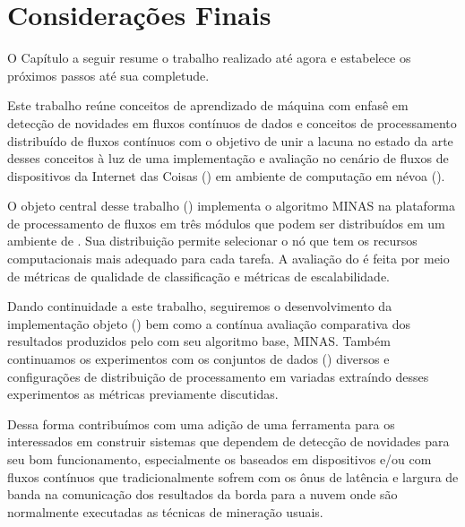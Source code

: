 \chapter{Considerações Finais}\label{cha:final}

\begin{resumocap}
  O Capítulo a seguir resume o trabalho realizado até agora e estabelece
  os próximos passos até sua completude.
\end{resumocap}

Este trabalho reúne conceitos de aprendizado de máquina com enfasê em detecção
de novidades em fluxos contínuos de dados e conceitos de processamento
distribuído de fluxos contínuos com o objetivo de unir a lacuna no estado da
arte desses conceitos à luz de uma implementação e avaliação no cenário de
fluxos de dispositivos da Internet das Coisas (\iot) em ambiente de computação
em névoa (\fog).

O objeto central desse trabalho (\mfog) implementa o algoritmo MINAS na
plataforma de processamento de fluxos \flink em três módulos que podem ser
distribuídos em um ambiente de \fog.
Sua distribuição permite selecionar o nó que tem os recursos computacionais mais
adequado para cada tarefa.
A avaliação do \mfog é feita por meio de métricas de qualidade de classificação
e métricas de escalabilidade.


Dando continuidade a este trabalho, seguiremos o desenvolvimento da implementação objeto
(\mfog) bem como a contínua avaliação comparativa dos resultados
produzidos pelo \mfog com seu algoritmo base, MINAS.
Também continuamos os experimentos com os conjuntos de dados (\datasets)
diversos e configurações de distribuição de processamento em \fog variadas
extraíndo desses experimentos as métricas previamente discutidas.


Dessa forma contribuímos com uma adição de uma ferramenta para os interessados
em construir sistemas que dependem de detecção de novidades para seu bom
funcionamento, especialmente os baseados em dispositivos \iot e/ou com fluxos
contínuos que tradicionalmente sofrem com os ônus de latência e largura de banda
na comunicação dos resultados da borda para a nuvem onde são normalmente
executadas as técnicas de mineração usuais.


